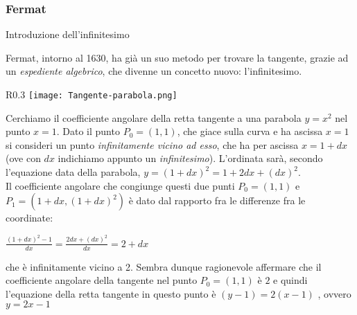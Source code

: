 \begin{frame}[label=Fermat]
    \frametitle{Fermat}
    \begin{block}{Introduzione dell'infinitesimo}

        Fermat, intorno al 1630, ha già un suo metodo per trovare la tangente, 
        grazie ad un \textit{espediente algebrico}, 
        che divenne un concetto nuovo: \alert{l'infinitesimo}.\\
        \begin{wrapfigure}{R}{0.3\textwidth}
            \centering
            \texttt{[image: Tangente-parabola.png]}
        \end{wrapfigure}
        Cerchiamo il coefficiente angolare della retta tangente a una parabola
        $y = x^2$ nel punto $x=1$. Dato il punto $P_0=(1,1)$, che giace sulla curva e ha ascissa $x=1$ si consideri 
        un punto \textit{infinitamente vicino ad esso}, che ha per ascissa $x=1+dx$
        (ove con $dx$ indichiamo appunto un \textit{infinitesimo}).
        L'ordinata sarà, secondo l'equazione data della parabola,
        $y= {(1+dx)}^2 = {1 + 2dx + {(dx)}^2}$.\\
        Il coefficiente angolare che congiunge questi due punti $P_0=(1,1)$ e 
        $P_1=(1+dx,{(1+dx)}^2)$ è dato dal rapporto fra le differenze fra le coordinate:
        \begin{center}
            $\frac{{(1+dx)}^2-1}{dx} = \frac{2dx+{(dx)}^2}{dx} = 2 + dx$
        \end{center}
        che è infinitamente vicino a 2. Sembra dunque ragionevole affermare che 
        il coefficiente angolare della tangente nel punto $P_0=(1,1)$ è $2$ e quindi 
        l'equazione della retta tangente in questo punto è
            $(y-1) = 2(x-1)$ , ovvero $y = 2x -1$
    \end{block}
\end{frame}